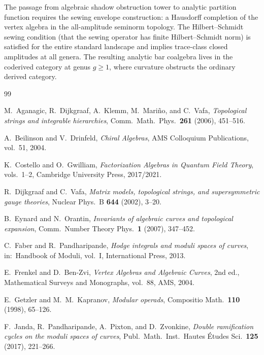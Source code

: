 \documentclass[11pt]{article}
\theoremstyle{plain}
\theoremstyle{definition}
\theoremstyle{remark}
\begin{document}
The passage from algebraic shadow obstruction tower to analytic
partition function requires the sewing envelope
construction: a Hausdorff completion of the vertex algebra
in the all-amplitude seminorm topology. The
Hilbert--Schmidt sewing condition (that the sewing
operator has finite Hilbert--Schmidt norm) is satisfied for
the entire standard landscape and implies trace-class
closed amplitudes at all genera. The resulting analytic bar
coalgebra lives in the coderived category at genus $g \geq 1$,
where curvature obstructs the ordinary derived category.


\begin{thebibliography}{99}

M.~Aganagic, R.~Dijkgraaf, A.~Klemm, M.~Mari\~no, and C.~Vafa,
\emph{Topological strings and integrable hierarchies},
Comm.\ Math.\ Phys.\ \textbf{261} (2006), 451--516.

A.~Beilinson and V.~Drinfeld,
\emph{Chiral Algebras},
AMS Colloquium Publications, vol.~51, 2004.

K.~Costello and O.~Gwilliam,
\emph{Factorization Algebras in Quantum Field Theory},
vols.~1--2, Cambridge University Press, 2017/2021.

R.~Dijkgraaf and C.~Vafa,
\emph{Matrix models, topological strings, and supersymmetric
gauge theories},
Nuclear Phys.\ B \textbf{644} (2002), 3--20.

B.~Eynard and N.~Orantin,
\emph{Invariants of algebraic curves and topological expansion},
Comm.\ Number Theory Phys.\ \textbf{1} (2007), 347--452.

C.~Faber and R.~Pandharipande,
\emph{Hodge integrals and moduli spaces of curves},
in:\ Handbook of Moduli, vol.~I, International Press, 2013.

E.~Frenkel and D.~Ben-Zvi,
\emph{Vertex Algebras and Algebraic Curves},
2nd ed., Mathematical Surveys and Monographs, vol.~88,
AMS, 2004.

E.~Getzler and M.~M.~Kapranov,
\emph{Modular operads},
Compositio Math.\ \textbf{110} (1998), 65--126.

F.~Janda, R.~Pandharipande, A.~Pixton, and D.~Zvonkine,
\emph{Double ramification cycles on the moduli spaces of curves},
Publ.\ Math.\ Inst.\ Hautes \'Etudes Sci.\ \textbf{125} (2017), 221--266.


\end{thebibliography}
\end{document}

